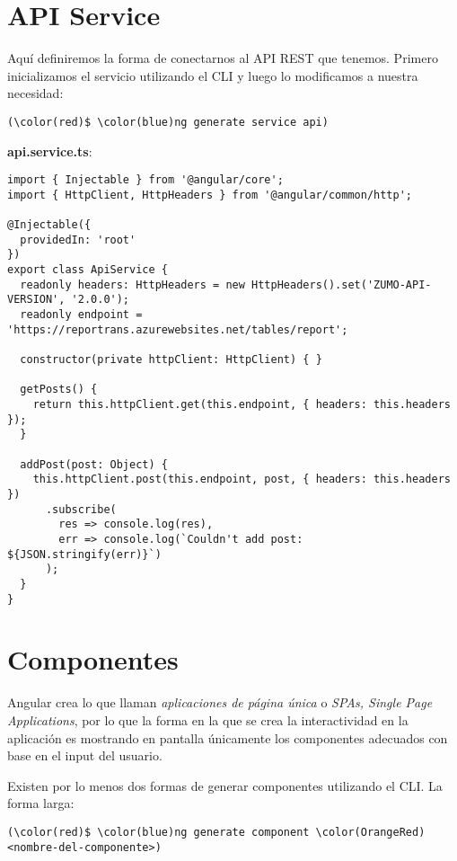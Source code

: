 \documentclass{article}
\begin{document}
\section{API Service}
Aqu\'i definiremos la forma de conectarnos al API REST que tenemos. Primero inicializamos el servicio utilizando el CLI y luego lo modificamos a nuestra necesidad:

\begin{Verbatim}[fontsize=\small,commandchars=\\\(\)]
    (\color(red)$ \color(blue)ng generate service api)
\end{Verbatim}

\vspace{0.5cm}
\textbf{api.service.ts}:
\begin{verbatim}
import { Injectable } from '@angular/core';
import { HttpClient, HttpHeaders } from '@angular/common/http';

@Injectable({
  providedIn: 'root'
})
export class ApiService {
  readonly headers: HttpHeaders = new HttpHeaders().set('ZUMO-API-VERSION', '2.0.0');
  readonly endpoint = 'https://reportrans.azurewebsites.net/tables/report';

  constructor(private httpClient: HttpClient) { }

  getPosts() {
    return this.httpClient.get(this.endpoint, { headers: this.headers });
  }

  addPost(post: Object) {
    this.httpClient.post(this.endpoint, post, { headers: this.headers })
      .subscribe(
        res => console.log(res),
        err => console.log(`Couldn't add post: ${JSON.stringify(err)}`)
      );
  }
}
\end{verbatim}


\section{Componentes}
Angular crea lo que llaman \textit{aplicaciones de p\'agina \'unica} o \textit{SPAs, Single Page Applications}, por lo que la forma en la que se crea la interactividad en la aplicaci\'on es mostrando en pantalla \'unicamente los componentes adecuados con base en el input del usuario.

Existen por lo menos dos formas de generar componentes utilizando el CLI. La forma larga:

\begin{Verbatim}[fontsize=\small,commandchars=\\\(\)]
    (\color(red)$ \color(blue)ng generate component \color(OrangeRed)<nombre-del-componente>)
\end{Verbatim}
\end{document}

